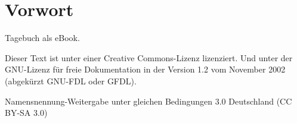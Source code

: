 \documentclass[a5paper,10pt]{article}
\title{}
\author{}
\begin{document}
\maketitle

\section{Vorwort}
\label{sec:vorwort}

Tagebuch als eBook.

Dieser Text ist unter einer Creative Commons-Lizenz lizenziert. 
Und unter der GNU-Lizenz für freie Dokumentation in der Version 1.2 vom November 
2002 (abgekürzt GNU-FDL oder GFDL). 

Namensnennung-Weitergabe unter gleichen Bedingungen 3.0 Deutschland (CC BY-SA 3.0) 

 \centering




































% 
 
\end{document}
